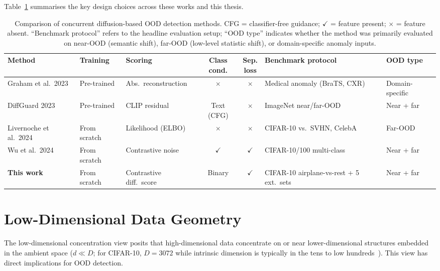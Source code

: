 Table~\ref{tab:bg:concurrent} summarises the key design choices across these works and this thesis.

\begin{table}[htbp]
  \centering
  \caption{Comparison of concurrent diffusion-based OOD detection methods.
    CFG = classifier-free guidance; $\checkmark$ = feature present;
    $\times$ = feature absent. ``Benchmark protocol'' refers to the
    headline evaluation setup; ``OOD type'' indicates whether the method
    was primarily evaluated on near-OOD (semantic shift), far-OOD
    (low-level statistic shift), or domain-specific anomaly inputs.}
  \label{tab:bg:concurrent}
  \scriptsize
  \setlength{\tabcolsep}{4pt}
  \begin{tabular}{@{}p{2.0cm}p{1.5cm}p{2.0cm}cc p{2.4cm} p{1.6cm}@{}}
    \toprule
    Method & Training & Scoring & \shortstack{Class\\cond.} & \shortstack{Sep.\\loss} & Benchmark protocol & OOD type \\
    \midrule
    Graham et al.\ 2023 \cite{graham2023denoising}  & Pre-trained & Abs.\ reconstruction & $\times$ & $\times$ & Medical anomaly (BraTS, CXR) & Domain-specific \\
    DiffGuard 2023 \cite{gao2023diffguard}           & Pre-trained & CLIP residual        & Text (CFG) & $\times$ & ImageNet near/far-OOD & Near + far \\
    Livernoche et al.\ 2024 \cite{livernoche2024diffusion} & From scratch & Likelihood (ELBO) & $\times$ & $\times$ & CIFAR-10 vs.\ SVHN, CelebA & Far-OOD \\
    Wu et al.\ 2024 \cite{wu2024diffusion}           & From scratch & Contrastive noise    & $\checkmark$ & $\checkmark$ & CIFAR-10/100 multi-class & Near + far \\
    \textbf{This work}                               & From scratch & Contrastive diff.\ score & Binary & $\checkmark$ & CIFAR-10 airplane-vs-rest + 5 ext.\ sets & Near + far \\
    \bottomrule
  \end{tabular}
\end{table}


\section{Low-Dimensional Data Geometry}
\label{sec:bg:manifold}

The low-dimensional concentration view posits that high-dimensional data concentrate on or near lower-dimensional structures embedded in the ambient space ($d \ll D$; for CIFAR-10, $D = 3072$ while intrinsic dimension is typically in the tens to low hundreds~\cite{pope2021intrinsic}). This view has direct implications for OOD detection.

